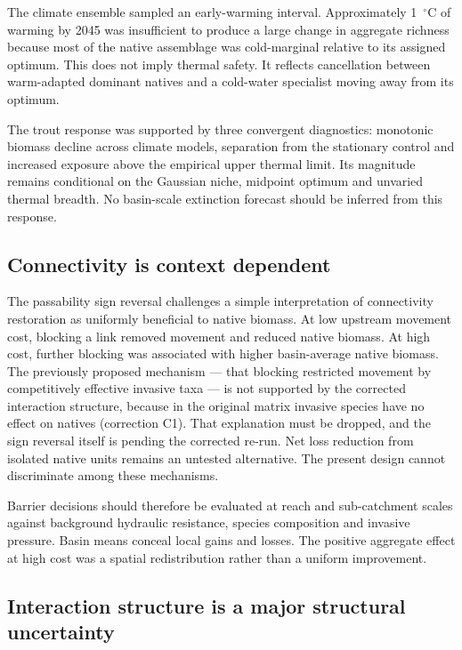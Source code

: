 \documentclass[11pt,a4paper]{article}
\begin{document}
The climate ensemble sampled an early-warming interval. Approximately 1~$^\circ$C of warming by 2045 was insufficient to produce a large change in aggregate richness because most of the native assemblage was cold-marginal relative to its assigned optimum. This does not imply thermal safety. It reflects cancellation between warm-adapted dominant natives and a cold-water specialist moving away from its optimum.

The trout response was supported by three convergent diagnostics: monotonic biomass decline across climate models, separation from the stationary control and increased exposure above the empirical upper thermal limit. Its magnitude remains conditional on the Gaussian niche, midpoint optimum and unvaried thermal breadth. No basin-scale extinction forecast should be inferred from this response.

\subsection{Connectivity is context dependent}

The passability sign reversal challenges a simple interpretation of connectivity restoration as uniformly beneficial to native biomass. At low upstream movement cost, blocking a link removed movement and reduced native biomass. At high cost, further blocking was associated with higher basin-average native biomass. The previously proposed mechanism --- that blocking restricted movement by competitively effective invasive taxa --- is not supported by the corrected interaction structure, because in the original matrix invasive species have no effect on natives (correction C1). That explanation must be dropped, and the sign reversal itself is pending the corrected re-run. Net loss reduction from isolated native units remains an untested alternative. The present design cannot discriminate among these mechanisms.

Barrier decisions should therefore be evaluated at reach and sub-catchment scales against background hydraulic resistance, species composition and invasive pressure. Basin means conceal local gains and losses. The positive aggregate effect at high cost was a spatial redistribution rather than a uniform improvement.

\subsection{Interaction structure is a major structural uncertainty}
\end{document}
